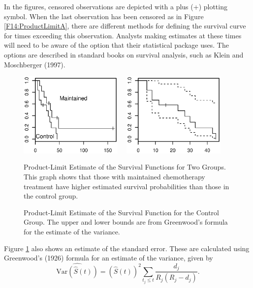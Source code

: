 In the figures, censored observations are depicted with a plus (+)
plotting symbol. When the last observation has been censored as in
Figure \ref{F14:ProductLimitA}, there are different methods for
defining the survival curve for times exceeding this observation.
Analysts making estimates at these times will need to be aware of
the option that their statistical package uses. The options are
described in standard books on survival analysis, such as Klein and
Moschberger (1997).


\begin{figure}[htp]
    \includegraphics[width=0.45\textwidth]
        {Chapter14Survival/F14ProductLimitA.eps} \hfill  $~~~$
               \includegraphics[width=0.45\textwidth]
        {Chapter14Survival/F14ProductLimitB.eps}

      \parbox[t]{2.5in}{\caption{\label{F14:ProductLimitA} \small Product-Limit
      Estimate of the Survival Functions for Two Groups.
      This graph shows that those with maintained chemotherapy treatment
      have higher estimated survival probabilities than those in the control group.}} \hfill
        \parbox[t]{2.5in}{\caption{\label{F14:ProductLimitB} \small Product-Limit
        Estimate of the Survival Function for the Control Group.
    The upper and lower bounds are from Greenwood's formula for the estimate of the variance.}}
\end{figure}

Figure \ref{F14:ProductLimitB} also shows an estimate of the
standard error. These are calculated using Greenwood's (1926)
formula for an estimate of the variance, given by
\begin{equation*}
\widehat{\mathrm{Var}(\widehat{S}(t))} = (\widehat{S}(t))^2
  \sum_{t_j \leq t}  \frac{d_j}{R_j(R_j-d_j)} .
\end{equation*}


